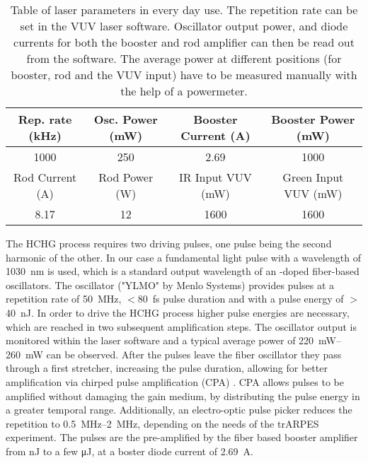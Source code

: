 \begin{table}[t]
	\centering
	\begin{tabular}{ *{4}{c} }
		\hline
		Rep. rate (\unit{\kilo\hertz})		& Osc. Power (\unit{\milli\watt}) 	& Booster Current (\unit{\ampere}) 		 & Booster Power (\unit{\milli\watt})	\\ \hline\hline
		1000								& 250							  	& 2.69								  	 & 1000									\\ \hline
		Rod Current (\unit{\ampere}) 		& Rod Power (\unit{\watt})			& IR Input VUV (\unit{\milli\watt})		 & Green Input VUV (\unit{\milli\watt})	\\ \hline\hline
		8.17								& 12					  			& 1600								   	 & 1600									\\ \hline
	\end{tabular}
	\caption{Table of laser parameters in every day use. The repetition rate can be set in the VUV laser software. Oscillator output power, and diode currents for both the booster and rod amplifier can then be read out from the software. The average power at different positions (for booster, rod and the VUV input) have to be measured manually with the help of a powermeter.}
	\label{tab:laser_param}
\end{table}

The HCHG process requires two driving pulses, one pulse being the second harmonic of the other.
In our case a fundamental light pulse with a wavelength of \qty{1030}{\nano\meter} is used, which is a standard output wavelength of an -doped fiber-based oscillators.
The oscillator ("YLMO" by Menlo Systems) provides pulses at a repetition rate of \qty{50}{\mega\hertz}, $<$\qty{80}{\femto\second} pulse duration and with a pulse energy of $>$\qty{40}{\nano\joule}.
In order to drive the HCHG process higher pulse energies are necessary, which are reached in two subsequent amplification steps.
The oscillator output is monitored within the laser software and a typical average power of \qtyrange{220}{260}{\milli\watt} can be observed.
After the pulses leave the fiber oscillator they pass through a first stretcher, increasing the pulse duration, allowing for better amplification via chirped pulse amplification (CPA) \cite{strickland_compression_1985,maine_generation_1988,strickland_chirped_2021}.
CPA allows pulses to be amplified without damaging the gain medium, by distributing the pulse energy in a greater temporal range. Additionally, an electro-optic pulse picker reduces the repetition to \qtyrange{0.5}{2}{\mega\hertz}, depending on the needs of the trARPES experiment.
The pulses are the pre-amplified by the fiber based booster amplifier from \unit{\nano\joule} to a few \unit{\micro\joule}, at a boster diode current of \qty{2.69}{\ampere}.

